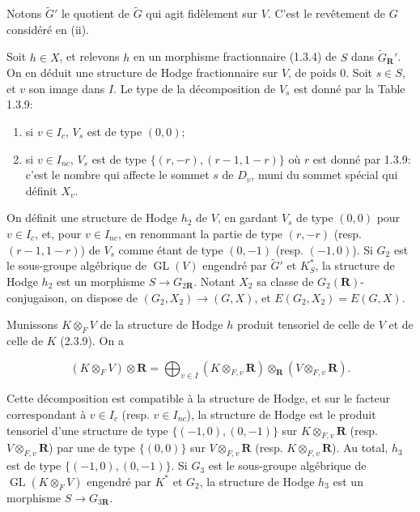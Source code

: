 \documentclass[10pt,a4paper]{article}
\begin{document}
Notons \(\widetilde G'\) le quotient de \(\widetilde G\) qui agit fidèlement sur \(V\). C'est le revêtement de \(G\) considéré en (ii).

Soit \(h\in X\), et relevons \(h\) en un morphisme fractionnaire (1.3.4) de \(S\) dans \(\widetilde G_{\mathbf R}'\). On en déduit une structure de Hodge fractionnaire sur \(V\), de poids 0. Soit \(s\in S\), et \(v\) son image dans \(I\). Le type de la décomposition de \(V_s\) est donné par la Table 1.3.9:

\begin{enumerate}
\def\labelenumi{(\alph{enumi})}
\item
  si \(v\in I_c\), \(V_s\) est de type \((0,0)\);
\item
  si \(v\in I_{nc}\), \(V_s\) est de type \(\{(r,-r),(r-1,1-r)\}\) où \(r\) est donné par 1.3.9: c'est le nombre qui affecte le sommet \(s\) de \(D_v\), muni du sommet spécial qui définit \(X_v\).
\end{enumerate}

On définit une structure de Hodge \(h_2\) de \(V\), en gardant \(V_s\) de type \((0,0)\) pour \(v\in I_c\), et, pour \(v\in I_{nc}\), en renommant la partie de type \((r,-r)\) (resp. \((r-1,1-r)\)) de \(V_s\) comme étant de type \((0,-1)\) (resp. \((-1,0)\)). Si \(G_2\) est le sous-groupe algébrique de \(\operatorname{GL}(V)\) engendré par \(\widetilde G'\) et \(K_S^*\), la structure de Hodge \(h_2\) est un morphisme \(S\to G_{2\mathbf R}\). Notant \(X_2\) sa classe de \(G_2(\mathbf R)\)-conjugaison, on dispose de \((G_2,X_2)\to(G,X)\), et \(E(G_2,X_2)=E(G,X)\).

Munissons \(K\otimes_F V\) de la structure de Hodge \(h\) produit tensoriel de celle de \(V\) et de celle de \(K\) (2.3.9). On a

\[
(K\otimes_F V)\otimes\mathbf R
=\bigoplus_{v\in I}(K\otimes_{F,v}\mathbf R)\otimes_{\mathbf R}(V\otimes_{F,v}\mathbf R).
\]

Cette décomposition est compatible à la structure de Hodge, et sur le facteur correspondant à \(v\in I_c\) (resp. \(v\in I_{nc}\)), la structure de Hodge est le produit tensoriel d'une structure de type \(\{(-1,0),(0,-1)\}\) sur \(K\otimes_{F,v}\mathbf R\) (resp. \(V\otimes_{F,v}\mathbf R\)) par une de type \(\{(0,0)\}\) sur \(V\otimes_{F,v}\mathbf R\) (resp. \(K\otimes_{F,v}\mathbf R\)). Au total, \(h_3\) est de type \(\{(-1,0),(0,-1)\}\). Si \(G_3\) est le sous-groupe algébrique de \(\operatorname{GL}(K\otimes_F V)\) engendré par \(K^*\) et \(G_2\), la structure de Hodge \(h_3\) est un morphisme \(S\to G_{3\mathbf R}\).
\end{document}
